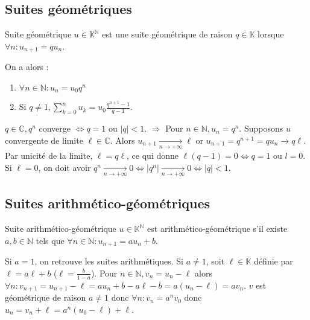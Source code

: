 \documentclass[12pt,a4paper]{report}
\begin{document}
\subsection{Suites géométriques}

\begin{definition}{Suite géométrique}{}
$u \in \mathbb{K}^\mathbb{N}$ est une suite géométrique de raison $q \in \mathbb{K}$ lorsque $\forall n : u_{n+1} = qu_n$.
\end{definition}
On a alors : \begin{enumerate}
\item $\forall n \in \mathbb{N} : u_n = u_0q^n$
\item Si $q \neq 1, \sum_{k=0}^nu_k = u_0\frac{q^{n+1}-1}{q-1}$.
\end{enumerate}

\begin{application}{}{}
$q \in \mathbb{C}, q^n$ converge $\Longleftrightarrow q=1$ ou $\lvert q \rvert < 1$.
\newline $\Longrightarrow$ Pour $n \in \mathbb{N}, u_n = q^n$. Supposons $u$ convergente de limite $\ell \in \mathbb{C}$. Alors $u_{n+1} \xrightarrow[n \rightarrow +\infty]{} \ell$ or $u_{n+1}=q^{n+1}=qu_n \rightarrow q\ell$.
\newline Par unicité de la limite, $\ell = q\ell$, ce qui donne $\ell(q-1)=0 \Longleftrightarrow q=1$ ou $l=0$.
\newline Si $\ell = 0$, on doit avoir $q^n \xrightarrow[n \rightarrow +\infty]{} 0 \Longleftrightarrow \lvert q^n \rvert \xrightarrow[n \rightarrow +\infty]{} 0 \Longleftrightarrow \lvert q \rvert < 1$.
\end{application}


\subsection{Suites arithmético-géométriques}
\begin{definition}{Suite arithmético-géométrique}{}
$u \in \mathbb{K}^\mathbb{N}$ est arithmético-géométrique s'il existe $a,b \in \mathbb{N}$ tels que $\forall n \in \mathbb{N} : u_{n+1} = au_n + b$.
\end{definition}

Si $a = 1$, on retrouve les suites arithmétiques.
\newline Si $a \neq 1$, soit $\ell \in \mathbb{K}$ définie par $\ell = a\ell + b$ ($\ell = \frac{b}{1-a}$).
\newline Pour $n \in \mathbb{N}, v_n = u_n - \ell$ alors $\forall n : v_{n+1} = u_{n+1} - \ell = au_n + b - a\ell - b = a(u_n - \ell) = av_n$.
\newline $v$ est géométrique de raison $a\neq 1$ donc $\forall n : v_n = a^nv_0$ donc $u_n = v_n+\ell = a^n(u_0-\ell)+\ell$.
\end{document}
